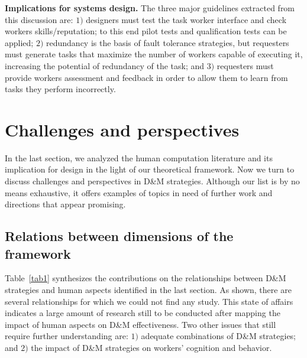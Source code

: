 \documentclass[11pt]{bmc_article_s50}
\begin{document}
\textbf{Implications for systems design.} The three major guidelines extracted from this discussion are: $1)$ designers must test the task worker interface and check workers skills/reputation; to this end pilot tests and qualification tests can be applied; $2)$ redundancy is the basis of fault tolerance strategies, but requesters must generate tasks that maximize the number of workers capable of executing it, increasing the potential of redundancy of the task; and $3)$ requesters must provide workers assessment and feedback in order to allow them to learn from tasks they perform incorrectly.\vspace*{-5pt} 

\section{Challenges and perspectives}

In the last section, we analyzed the human computation literature and its implication for design in the light of our theoretical framework. Now we turn to discuss challenges and perspectives in D\&M strategies. Although our list is by no means exhaustive, it offers examples of topics in need of further work and directions that appear promising.

\subsection{Relations between dimensions of the framework}

Table~\ref{tab1} synthesizes the contributions on the relationships between D\&M strategies and human aspects identified in the last section. As shown, there are several relationships for which we could not find any study. This state of affairs indicates a large amount of research still to be conducted after mapping the impact of human aspects on D\&M effectiveness. Two other issues that still require further understanding are: $1)$ adequate combinations of D\&M strategies; and $2)$ the impact of D\&M strategies on workers' cognition and behavior.
\end{document}
